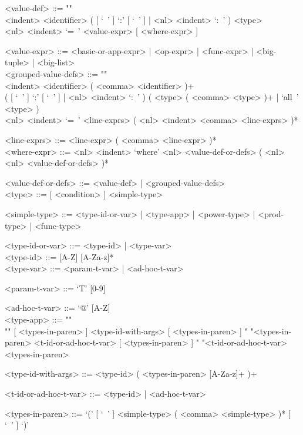 \documentclass{article}
\begin{document}
\begin{grammar}
<value-def> ::= ""\\
<indent> <identifier> 
( [ `\ ' ] `:' [ `\ ' ] | <nl> <indent> `:\ ' ) <type>  \\
<nl> <indent> `=\ ' <value-expr> [ <where-expr> ]

<value-expr> ::=
<basic-or-app-expr> | <op-expr> | <func-expr> | <big-tuple> | <big-list>
\\

<grouped-value-defs> ::= ""\\
<indent> <identifier> ( <comma> <identifier> )+ \\
( [ `\ ' ] `:' [ `\ ' ] | <nl> <indent> `:\ ' )
( <type> ( <comma> <type> )+ | `all\ ' <type> ) \\
<nl> <indent> `=\ ' <line-exprs> ( <nl> <indent> <comma> <line-exprs> )*

<line-exprs> ::= <line-expr> ( <comma> <line-expr> )*
\\

<where-expr> ::=
<nl> <indent> `where'
<nl> <value-def-or-defs> ( <nl> <nl> <value-def-or-defs> )*

<value-def-or-defs> ::= <value-def> | <grouped-value-defs> 
\\

<type> ::= [ <condition> ]  <simple-type> 

<simple-type> ::=
<type-id-or-var> | <type-app> | <power-type> | <prod-type> | <func-type>

<type-id-or-var> ::= <type-id> | <type-var>
\\

<type-id> ::= [A-Z] [A-Za-z]*
\\

<type-var> ::= <param-t-var> | <ad-hoc-t-var> 

<param-t-var> ::= `T' [0-9] 

<ad-hoc-t-var> ::= `@' [A-Z] 
\\

<type-app> ::= ""\\""
[ <types-in-paren> ] <type-id-with-args> [ <types-in-paren> ]
\alt " "<types-in-paren> <t-id-or-ad-hoc-t-var> [ <types-in-paren> ]
\alt " "<t-id-or-ad-hoc-t-var> <types-in-paren>

<type-id-with-args> ::= <type-id> ( <types-in-paren> [A-Za-z]+ )+

<t-id-or-ad-hoc-t-var> ::= <type-id> | <ad-hoc-t-var>

<types-in-paren> ::=
`(' [ `\ ' ] <simple-type> ( <comma> <simple-type> )* [ `\ ' ] `)'
\\


\end{grammar}
\end{document}
